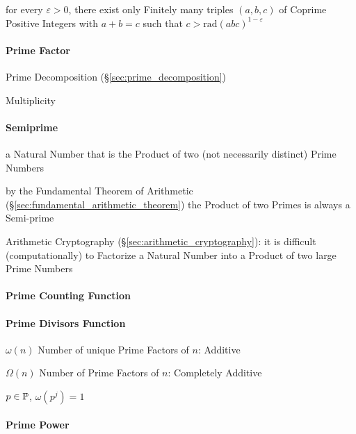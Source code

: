 for every $\varepsilon > 0$, there exist only Finitely many triples $(a,b,c)$ of
Coprime Positive Integers with $a + b = c$ such that
$c > \mathrm{rad}(abc)^{1-\varepsilon}$



\paragraph{Prime Factor}\label{sec:prime_factor}\hfill

Prime Decomposition (\S\ref{sec:prime_decomposition})

Multiplicity



\paragraph{Semiprime}\label{sec:semiprime}\hfill

a Natural Number that is the Product of two (not necessarily distinct) Prime
Numbers

by the Fundamental Theorem of Arithmetic
(\S\ref{sec:fundamental_arithmetic_theorem}) the Product of two Primes is
always a Semi-prime

\fist Arithmetic Cryptography (\S\ref{sec:arithmetic_cryptography}): it is
difficult (computationally) to Factorize a Natural Number into a Product of two
large Prime Numbers



\paragraph{Prime Counting Function}\label{sec:prime_counting}\hfill

\paragraph{Prime Divisors Function}\label{sec:prime_divisors}\hfill

$\omega(n)$ Number of unique Prime Factors of $n$: Additive

$\Omega(n)$ Number of Prime Factors of $n$: Completely Additive

$p \in \mathbb{P}$, $\omega(p^j) = 1$



\paragraph{Prime Power}\label{sec:prime_power}\hfill

